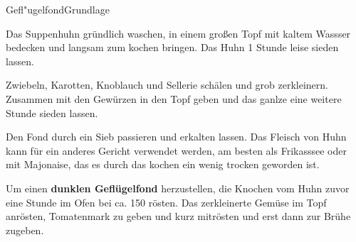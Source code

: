 \begin{recipe}{Gefl"ugelfond}{Grundlage}
  \label{Geflügelfond}
  \inglist

  \steps
  Das Suppenhuhn gründlich waschen, in einem großen Topf mit kaltem Wassser bedecken und
  langsam zum kochen bringen. Das Huhn 1 Stunde leise sieden lassen.

  Zwiebeln, Karotten, Knoblauch und Sellerie schälen und grob zerkleinern. Zusammen mit den
  Gewürzen in den Topf geben und das ganlze eine weitere Stunde sieden lassen.

  Den Fond durch ein Sieb passieren und erkalten lassen. Das Fleisch von Huhn kann für ein
  anderes Gericht verwendet werden, am besten als Frikasssee oder mit Majonaise, das es
  durch das kochen ein wenig trocken geworden ist.

  Um einen \textbf{dunklen Geflügelfond} herzustellen, die Knochen vom Huhn zuvor eine
  Stunde im Ofen bei ca. 150 \celsius rösten. Das zerkleinerte Gemüse im Topf anrösten,
  Tomatenmark zu geben und kurz mitrösten und erst dann zur Brühe zugeben.
\end{recipe}
